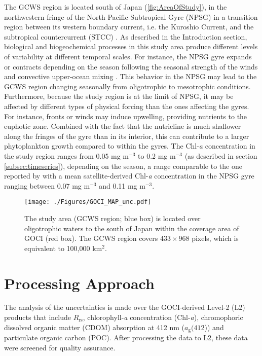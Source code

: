 \documentclass[remotesensing,article,submit,moreauthors,pdftex,10pt,a4paper]{Definitions/mdpi}
\begin{document}
The GCWS region is located south of Japan (\autoref{fig:AreaOfStudy}), in the northwestern fringe of the North Pacific Subtropical Gyre (NPSG) in a transition region between its western boundary current, i.e. the Kuroshio Current, and the subtropical countercurrent (STCC) \cite{Qiu_2011_Kuroshio}. As described in the Introduction section, biological and biogeochemical processes in this study area produce different levels of variability at different temporal scales. For instance, the NPSG gyre expands or contracts depending on the season following the seasonal strength of the winds and convective upper-ocean mixing \cite{McClain_2004_gyres,Signorini_2015}. This behavior in the NPSG may lead to the GCWS region changing seasonally from oligotrophic to mesotrophic conditions. Furthermore, because the study region is at the limit of NPSG, it may be affected by different types of physical forcing than the ones affecting the gyres. For instance, fronts or winds may induce upwelling, providing nutrients to the euphotic zone. Combined with the fact that the nutricline is much shallower along the fringes of the gyre than in its interior, this can contribute to a larger phytoplankton growth compared to within the gyres. The Chl-{\it a} concentration in the study region ranges from 0.05 mg m$^{-3}$ to 0.2 mg m$^{-3}$ (as described in section \ref{subsec:timeseries}), depending on the season, a range comparable to the one reported by \cite{Signorini_2015} with a mean satellite-derived Chl-{\it a} concentration in the NPSG gyre ranging between 0.07 mg m$^{-3}$ and 0.11 mg m$^{-3}$.

\begin{figure}[ht]
\centering
\texttt{[image: ./Figures/GOCI\_MAP\_unc.pdf]}
  \caption{The study area (GCWS region; blue box) is located over oligotrophic waters to the south of Japan within the coverage area of GOCI (red box). The GCWS region covers $433\times968$ pixels, which is equivalent to 100,000 km$^2$.}
	\label{fig:AreaOfStudy}
\end{figure}


\section{Processing Approach}
\label{sec:processing}
The analysis of the uncertainties is made over the GOCI-derived Level-2 (L2) products that include $R_\text{rs}$, chlorophyll-{\it a} concentration (Chl-{\it a}), chromophoric dissolved organic matter (CDOM) absorption at 412 nm ($a_\text{g}(412$)) and particulate organic carbon (POC). After processing the data to L2, these data were screened for quality assurance. 
\end{document}
